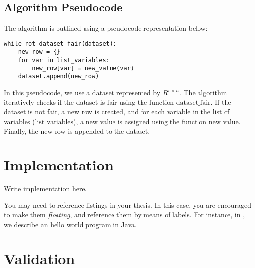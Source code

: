 \documentclass[12pt,a4paper,openright,twoside]{book}
\begin{document}
\section{Algorithm Pseudocode}

The algorithm is outlined using a pseudocode representation below:

\begin{verbatim}
while not dataset_fair(dataset):
    new_row = {}
    for var in list_variables:
        new_row[var] = new_value(var)
    dataset.append(new_row)
\end{verbatim}

In this pseudocode, we use a dataset represented by \( R^{n \times n} \). The algorithm iteratively checks if the dataset is fair using the function \( \text{dataset\_fair} \). If the dataset is not fair, a new row is created, and for each variable in the list of variables (\( \text{list\_variables} \)), a new value is assigned using the function \( \text{new\_value} \). Finally, the new row is appended to the dataset.


%
%

\chapter{Implementation} %
\label{chap:implementation}

Write implementation here.



You may need to reference listings in your thesis.
%
In this case, you are encouraged to make them \emph{floating}, and reference them by means of labels.
%
For instance, in , we describe an hello world program in Java.

\chapter{Validation} %
\label{chap:validation}
\end{document}
